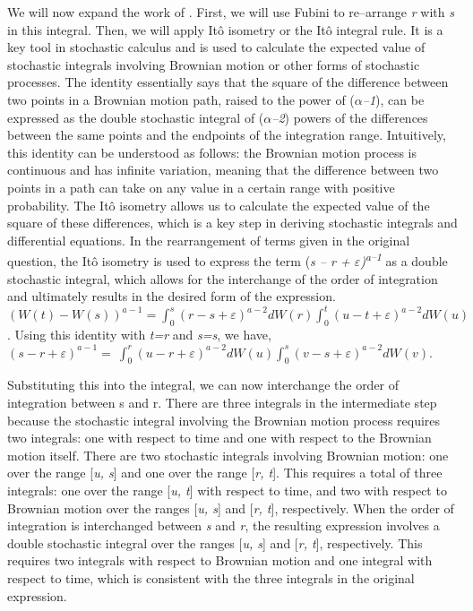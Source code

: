 \documentclass[12pt,a4paper]{report}
\numberwithin{equation}{section}
\begin{document}
We will now expand the work of \cite{jafari2021fuzzy_81}. First, we will use Fubini to
re--arrange \emph{r} with \emph{s} in this integral. Then, we will apply
Itô isometry or the Itô integral rule. It is a key tool in stochastic
calculus and is used to calculate the expected value of stochastic
integrals involving Brownian motion or other forms of stochastic
processes. The identity essentially says that the square of the
difference between two points in a Brownian motion path, raised to the
power of (\emph{$\alpha$--1}), can be expressed as the double stochastic
integral of (\emph{$\alpha$--2}) powers of the differences between the same
points and the endpoints of the integration range. Intuitively, this
identity can be understood as follows: the Brownian motion process is
continuous and has infinite variation, meaning that the difference
between two points in a path can take on any value in a certain range
with positive probability. The Itô isometry \cite{lalley2016university_86} allows us to
calculate the expected value of the square of these differences, which
is a key step in deriving stochastic integrals and differential
equations. In the rearrangement of terms given in the original question,
the Itô isometry is used to express the term (\emph{s -- r +
$\varepsilon$)\textsuperscript{a--1}} as a double stochastic integral, which allows
for the interchange of the order of integration and ultimately results
in the desired form of the expression.
\((W(t) - W(s))^{a - 1} = \int_{0}^{s}{(r - s + \varepsilon)^{a - 2}dW(r)\int_{0}^{t}{(u - t + \varepsilon)^{a - 2}dW(u)}}\).
Using this identity with \emph{t=r} and \emph{s=s}, we have,
\((s - r + \varepsilon)^{a - 1} = \ \int_{0}^{r}{(u - r + \varepsilon)^{a - 2}dW(u)\int_{0}^{s}{(v - s + \varepsilon)^{a - 2}dW(v).}}\)

Substituting this into the integral, we can now interchange the order of
integration between s and r. There are three integrals in the
intermediate step because the stochastic integral involving the Brownian
motion process requires two integrals: one with respect to time and one
with respect to the Brownian motion itself. There are two stochastic
integrals involving Brownian motion: one over the range {[}\emph{u,
s}{]} and one over the range {[}\emph{r, t}{]}. This requires a total of
three integrals: one over the range {[}\emph{u, t}{]} with respect to
time, and two with respect to Brownian motion over the ranges
{[}\emph{u, s}{]} and {[}\emph{r, t}{]}, respectively. When the order of
integration is interchanged between \emph{s} and \emph{r}, the resulting
expression involves a double stochastic integral over the ranges
{[}\emph{u, s}{]} and {[}\emph{r, t}{]}, respectively. This requires two
integrals with respect to Brownian motion and one integral with respect
to time, which is consistent with the three integrals in the original
expression.
\end{document}
